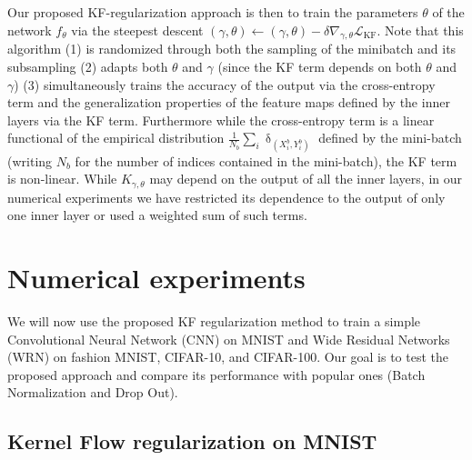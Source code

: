 \documentclass[11pt]{article}
\def\L{\mathcal{L}}
\begin{document}
Our proposed KF-regularization approach is then to train the parameters $\theta$ of the network $f_\theta$ via the steepest descent $(\gamma,\theta)\leftarrow (\gamma,\theta) - \delta \nabla_{\gamma,\theta} \L_\text{KF}$.
Note that this algorithm (1) is randomized through both the sampling of the minibatch and its subsampling (2) adapts both $\theta$ and $\gamma$ (since the KF term depends on both $\theta$ and $\gamma$)  (3) simultaneously trains the accuracy of the output via the cross-entropy term and the generalization properties of the feature maps defined by the inner layers via the KF term. Furthermore while  the cross-entropy term is a linear functional of the empirical distribution $\frac{1}{N_b}\sum_i \updelta_{(X^b_i,Y^b_i)} $ defined by the mini-batch (writing $N_b$ for the number of indices contained in the mini-batch), the KF term is non-linear.
While $K_{\gamma,\theta}$ may depend on the output of all the inner layers, in our numerical experiments we have restricted its
dependence to the output of only one inner layer or used a weighted sum of such terms.


\section{Numerical experiments}

We will now use the  proposed KF regularization method to train a simple Convolutional Neural Network (CNN) on MNIST and Wide Residual Networks (WRN) \cite{WRNZagKom} on fashion MNIST, CIFAR-10, and CIFAR-100. Our goal is to test the proposed approach and compare its performance with popular ones (Batch Normalization and Drop Out).


\subsection{Kernel Flow regularization on MNIST}
\end{document}

